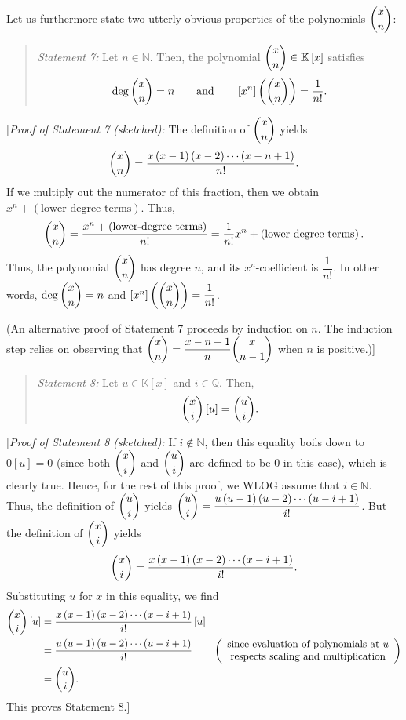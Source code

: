 \documentclass[paper=a4, fontsize=12pt]{scrartcl}%
\theoremstyle{plainsl}
\theoremstyle{definition}
\theoremstyle{remark}
\newenvironment{statement}{\begin{quote}}{\end{quote}}
\begin{document}
\bigskip

Let us furthermore state two utterly obvious properties of the polynomials
$\dbinom{x}{n}$:

\begin{statement}
\textit{Statement 7:} Let $n\in\mathbb{N}$. Then, the polynomial $\dbinom
{x}{n}\in\mathbb{K}\left[  x\right]  $ satisfies
\[
\deg\dbinom{x}{n}=n\qquad\text{and}\qquad\left[  x^{n}\right]  \left(
\dbinom{x}{n}\right)  =\dfrac{1}{n!}.
\]

\end{statement}

[\textit{Proof of Statement 7 (sketched):} The definition of $\dbinom{x}{n}$
yields%
\[
\dbinom{x}{n}=\dfrac{x\left(  x-1\right)  \left(  x-2\right)  \cdots\left(
x-n+1\right)  }{n!}.
\]
If we multiply out the numerator of this fraction, then we obtain
$x^{n}+\left(  \text{lower-degree terms}\right)  $. Thus,%
\[
\dbinom{x}{n}=\dfrac{x^{n}+\left(  \text{lower-degree terms}\right)  }%
{n!}=\dfrac{1}{n!}x^{n}+\left(  \text{lower-degree terms}\right)  .
\]
Thus, the polynomial $\dbinom{x}{n}$ has degree $n$, and its $x^{n}%
$-coefficient is $\dfrac{1}{n!}$. In other words, $\deg\dbinom{x}{n}=n$ and
$\left[  x^{n}\right]  \left(  \dbinom{x}{n}\right)  =\dfrac{1}{n!}$.

(An alternative proof of Statement 7 proceeds by induction on $n$. The
induction step relies on observing that $\dbinom{x}{n}=\dfrac{x-n+1}{n}%
\dbinom{x}{n-1}$ when $n$ is positive.)]

\begin{statement}
\textit{Statement 8:} Let $u\in\mathbb{K}\left[  x\right]  $ and
$i\in\mathbb{Q}$. Then,%
\[
\dbinom{x}{i}\left[  u\right]  =\dbinom{u}{i}.
\]

\end{statement}

[\textit{Proof of Statement 8 (sketched):} If $i\notin\mathbb{N}$, then this
equality boils down to $0\left[  u\right]  =0$ (since both $\dbinom{x}{i}$ and
$\dbinom{u}{i}$ are defined to be $0$ in this case), which is clearly true.
Hence, for the rest of this proof, we WLOG assume that $i\in\mathbb{N}$. Thus,
the definition of $\dbinom{u}{i}$ yields $\dbinom{u}{i}=\dfrac{u\left(
u-1\right)  \left(  u-2\right)  \cdots\left(  u-i+1\right)  }{i!}$. But the
definition of $\dbinom{x}{i}$ yields%
\[
\dbinom{x}{i}=\dfrac{x\left(  x-1\right)  \left(  x-2\right)  \cdots\left(
x-i+1\right)  }{i!}.
\]
Substituting $u$ for $x$ in this equality, we find%
\begin{align*}
\dbinom{x}{i}\left[  u\right]   &  =\dfrac{x\left(  x-1\right)  \left(
x-2\right)  \cdots\left(  x-i+1\right)  }{i!}\left[  u\right] \\
&  =\dfrac{u\left(  u-1\right)  \left(  u-2\right)  \cdots\left(
u-i+1\right)  }{i!}\qquad\left(
\begin{array}
[c]{c}%
\text{since evaluation of polynomials at }u\\
\text{respects scaling and multiplication}%
\end{array}
\right) \\
&  =\dbinom{u}{i}.
\end{align*}
This proves Statement 8.]
\end{document}
